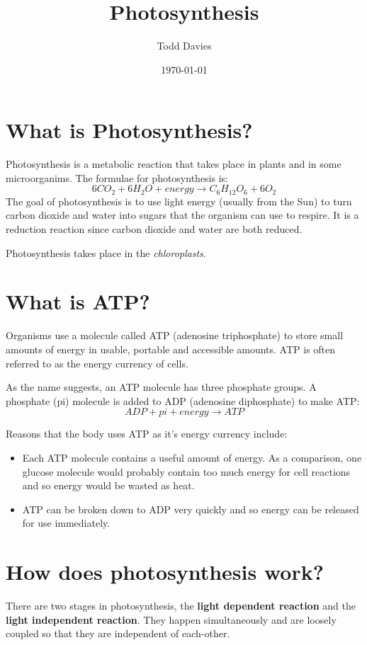 \documentclass{article}
\title{Photosynthesis}
\author{Todd Davies}
\date{\today}
\begin{document}
\lhead{\today}

\maketitle

\section*{What is Photosynthesis?}
\thispagestyle{empty}
Photosynthesis is a metabolic reaction that takes place in plants and in some
microorganims. The formulae for photosynthesis is:
\[
	6CO_2 + 6H_2O + energy \rightarrow C_6H_{12}O_6 + 6O_2
\]
The goal of photosynthesis is to use light energy (usually from the Sun) to turn
carbon dioxide and water into sugars that the organism can use to respire. It is
a reduction reaction since carbon dioxide and water are both reduced.

Photosynthesis takes place in the \textit{chloroplasts}.
\section*{What is ATP?}
Organisms use a molecule called ATP (adenosine triphosphate) to store small
amounts of energy in usable, portable and accessible amounts. ATP is often
referred to as the energy currency of cells. 

As the name suggests, an ATP molecule has three phosphate groups. A phosphate
(pi) molecule is added to ADP (adenosine diphosphate) to make ATP:
\[
	ADP + pi + energy \rightarrow ATP
\]

Reasons that the body uses ATP as it's energy currency include:
\begin{itemize}
	\item Each ATP molecule contains a useful amount of energy. As a comparison,
	one glucose molecule would probably contain too much energy for cell
	reactions and so energy would be wasted as heat.
	\item ATP can be broken down to ADP very quickly and so energy can be
	released for use immediately.
\end{itemize}

\section*{How does photosynthesis work?}
There are two stages in photosynthesis, the \textbf{light dependent reaction}
and the \textbf{light independent reaction}. They happen simultaneously and are
loosely coupled so that they are independent of each-other.
\end{document}
